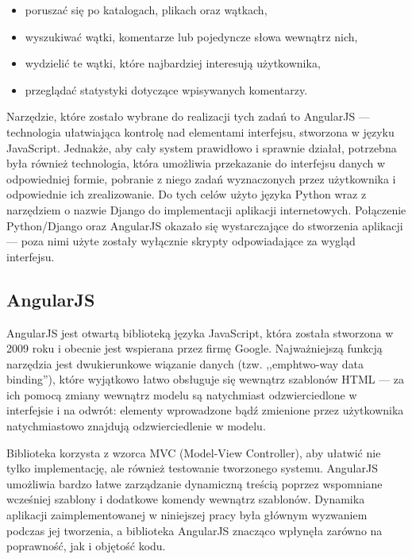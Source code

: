 \documentclass[polish,a4paper,twoside]{ppfcmthesis}
\begin{document}
\begin{itemize}[noitemsep]
  \item poruszać się po katalogach, plikach oraz wątkach,
  \item wyszukiwać wątki, komentarze lub pojedyncze słowa wewnątrz nich,
  \item wydzielić te wątki, które najbardziej interesują użytkownika,
  \item przeglądać statystyki dotyczące wpisywanych komentarzy.
\end{itemize}

Narzędzie, które zostało wybrane do realizacji tych zadań to AngularJS \cite{angular} --- technologia ułatwiająca kontrolę nad elementami interfejsu, stworzona w języku JavaScript. Jednakże, aby cały system prawidłowo i sprawnie działał, potrzebna była również technologia, która umożliwia przekazanie do interfejsu danych w odpowiedniej formie, pobranie z niego zadań wyznaczonych przez użytkownika i odpowiednie ich zrealizowanie. Do tych celów użyto języka Python \cite{python} wraz z narzędziem o nazwie Django \cite{django} do implementacji aplikacji internetowych. Połączenie Python/Django oraz AngularJS okazało się wystarczające do stworzenia aplikacji --- poza nimi użyte zostały wyłącznie skrypty odpowiadające za wygląd interfejsu.

\subsection*{AngularJS}

AngularJS jest otwartą biblioteką języka JavaScript, która została stworzona w 2009 roku i obecnie jest wspierana przez firmę Google. Najważniejszą funkcją narzędzia jest dwukierunkowe wiązanie danych (tzw. ,,emph{two-way data binding}''), które wyjątkowo łatwo obsługuje się wewnątrz szablonów HTML --- za ich pomocą zmiany wewnątrz modelu są natychmiast odzwierciedlone w interfejsie i na odwrót: elementy wprowadzone bądź zmienione przez użytkownika natychmiastowo znajdują odzwierciedlenie w modelu.

Biblioteka korzysta z wzorca MVC (Model-View Controller), aby ułatwić nie tylko implementację, ale również testowanie tworzonego systemu. AngularJS umożliwia bardzo łatwe zarządzanie dynamiczną treścią poprzez wspomniane wcześniej szablony i dodatkowe komendy wewnątrz szablonów. Dynamika aplikacji zaimplementowanej w niniejszej pracy była głównym wyzwaniem podczas jej tworzenia, a biblioteka AngularJS znacząco wpłynęła zarówno na poprawność, jak i objętość kodu.
\end{document}

